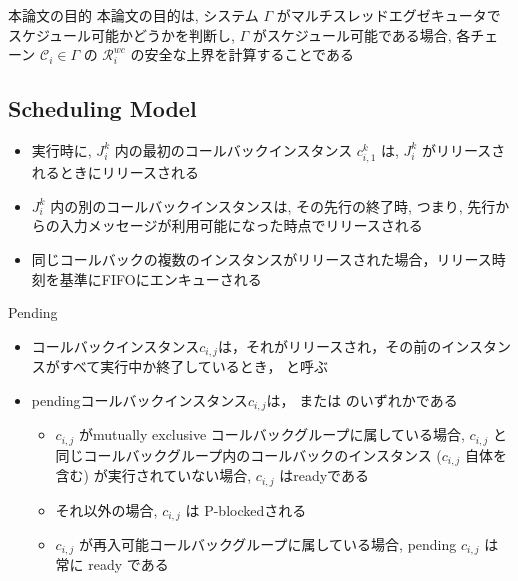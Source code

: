 \begin{frame}{本論文の目的}
    本論文の目的は, システム $\Gamma$ がマルチスレッドエグゼキュータでスケジュール可能かどうかを判断し, $\Gamma$ がスケジュール可能である場合, 各チェーン $\mathcal{C}_{i} \in \Gamma$ の $\mathcal{R}_{i}^{w c}$ の安全な上界を計算することである
\end{frame}


\subsection{Scheduling Model}
\label{ssec: scheduling_model}


\begin{frame}{}
    \begin{itemize}
        \item 実行時に, $J_{i}^{k}$ 内の最初のコールバックインスタンス $c_{i, 1}^{k}$ は, $J_{i}^{k}$ がリリースされるときにリリースされる
        \item $J_{i}^{k}$ 内の別のコールバックインスタンスは, その先行の終了時, つまり, 先行からの入力メッセージが利用可能になった時点でリリースされる
        \item 同じコールバックの複数のインスタンスがリリースされた場合，リリース時刻を基準にFIFOにエンキューされる
    \end{itemize}
\end{frame}

\begin{frame}{Pending}


    \begin{itemize}
        \item コールバックインスタンス$c_{i, j}$は，それがリリースされ，その前のインスタンスがすべて実行中か終了しているとき， と呼ぶ
        \item pendingコールバックインスタンス$c_{i, j}$は， または のいずれかである
              \begin{itemize}
                  \item  $c_{i, j}$ がmutually exclusive コールバックグループに属している場合, $c_{i, j}$ と同じコールバックグループ内のコールバックのインスタンス ($c_{i, j}$ 自体を含む) が実行されていない場合, $c_{i, j}$ はreadyである
                  \item それ以外の場合, $c_{i, j}$ は P-blockedされる

                  \item  $c_{i, j}$ が再入可能コールバックグループに属している場合, pending $c_{i, j}$ は常に ready である
              \end{itemize}
    \end{itemize}
\end{frame}

